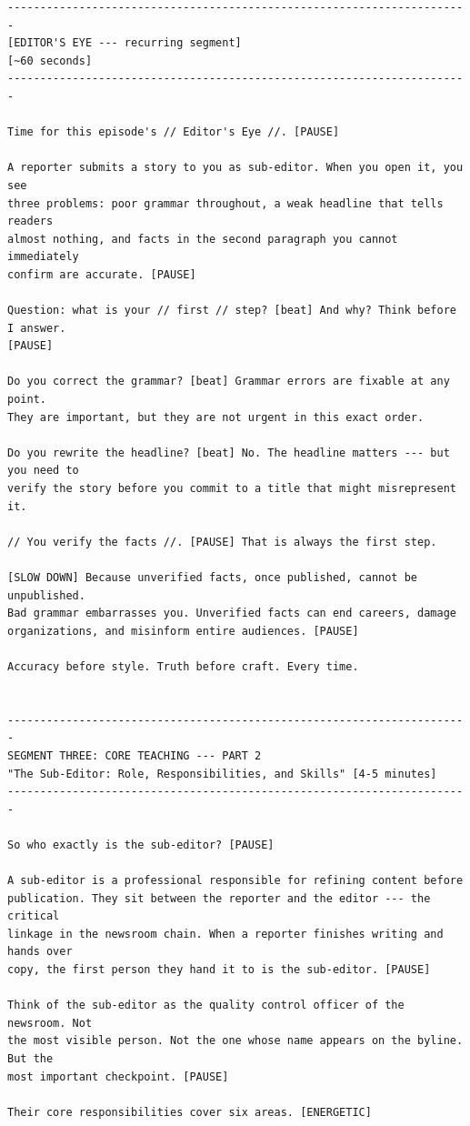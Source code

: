 {\begin{Verbatim}
-----------------------------------------------------------------------
[EDITOR'S EYE --- recurring segment]
[~60 seconds]
-----------------------------------------------------------------------

Time for this episode's // Editor's Eye //. [PAUSE]

A reporter submits a story to you as sub-editor. When you open it, you see
three problems: poor grammar throughout, a weak headline that tells readers
almost nothing, and facts in the second paragraph you cannot immediately
confirm are accurate. [PAUSE]

Question: what is your // first // step? [beat] And why? Think before I answer.
[PAUSE]

Do you correct the grammar? [beat] Grammar errors are fixable at any point.
They are important, but they are not urgent in this exact order.

Do you rewrite the headline? [beat] No. The headline matters --- but you need to
verify the story before you commit to a title that might misrepresent it.

// You verify the facts //. [PAUSE] That is always the first step.

[SLOW DOWN] Because unverified facts, once published, cannot be unpublished.
Bad grammar embarrasses you. Unverified facts can end careers, damage
organizations, and misinform entire audiences. [PAUSE]

Accuracy before style. Truth before craft. Every time.


-----------------------------------------------------------------------
SEGMENT THREE: CORE TEACHING --- PART 2
"The Sub-Editor: Role, Responsibilities, and Skills" [4-5 minutes]
-----------------------------------------------------------------------

So who exactly is the sub-editor? [PAUSE]

A sub-editor is a professional responsible for refining content before
publication. They sit between the reporter and the editor --- the critical
linkage in the newsroom chain. When a reporter finishes writing and hands over
copy, the first person they hand it to is the sub-editor. [PAUSE]

Think of the sub-editor as the quality control officer of the newsroom. Not
the most visible person. Not the one whose name appears on the byline. But the
most important checkpoint. [PAUSE]

Their core responsibilities cover six areas. [ENERGETIC]


\end{Verbatim}}
